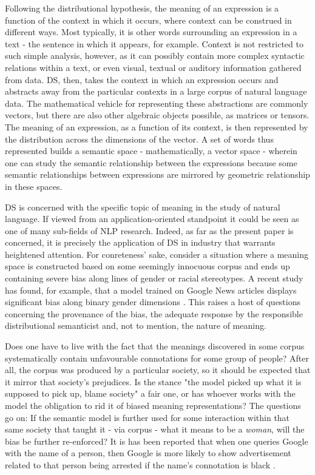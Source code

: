 \documentclass{article}
\begin{document}
Following the distributional hypothesis, the meaning of an expression is a function of the context in which it occurs, where context can be construed in different ways. Most typically, it is other words surrounding an expression in a text - the sentence in which it appears, for example. Context is not restricted to such simple analysis, however, as it can possibly contain more complex syntactic relations within a text, or even visual, textual or auditory information gathered from data.
\cite{boleda2016formal}
DS, then, takes the context in which an expression occurs and abstracts away from the particular contexts in a large corpus of natural language data. The mathematical vehicle for representing these abstractions are commonly vectors, but there are also other algebraic objects possible, as matrices or tensors. The meaning of an expression, as a function of its context, is then represented by the distribution across the dimensions of the vector. A set of words thus represented builds a semantic space - mathematically, a vector space - wherein one can study the semantic relationship between the expressions because some semantic relationships between expressions are mirrored by geometric relationship in these spaces.

DS is concerned with the specific topic of meaning in the study of natural language. If viewed from an application-oriented standpoint it could be seen as one of many sub-fields of NLP research. Indeed, as far as the present paper is concerned, it is precisely the application of DS in industry that warrants heightened attention.
For conreteness' sake, consider a situation where a meaning space is constructed based on some seemingly innocuous corpus and ends up containing severe bias along lines of gender or racial stereotypes. A recent study has found, for example, that a model trained on Google News articles displays significant bias along binary gender dimensions \cite{bolukbasi2016man}. This raises a host of questions concerning the provenance of the bias, the adequate response by the responsible distributional semanticist and, not to mention, the nature of meaning.

Does one have to live with the fact that the meanings discovered in some corpus systematically contain unfavourable connotations for some group of people? After all, the corpus was produced by a particular society, so it should be expected that it mirror that society's prejudices. Is the stance "the model picked up what it is supposed to pick up, blame society" a fair one, or has whoever works with the model the obligation to rid it of biased meaning representations? The questions go on: If the semantic model is further used for some interaction within that same society that taught it - via corpus - what it means to be a \emph{woman}, will the bias be further re-enforced? It is has been reported that when one queries Google with the name of a person, then Google is more likely to show advertisement related to that person being arrested if the name's connotation is black \cite{sweeney2013discrimination}.
\end{document}
